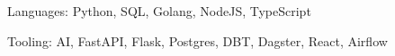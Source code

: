 


\begin{cvskills}


\cvskill
{Languages:} %
{Python, SQL, Golang, NodeJS, TypeScript} %


\cvskill
{Tooling:} %
{AI, FastAPI, Flask, Postgres, DBT, Dagster, React, Airflow}


\end{cvskills}